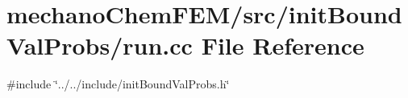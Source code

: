 \section{mechano\+Chem\+F\+E\+M/src/init\+Bound\+Val\+Probs/run.cc File Reference}
\label{run_8cc}
{\ttfamily \#include \char`\"{}../../include/init\+Bound\+Val\+Probs.\+h\char`\"{}}\newline

